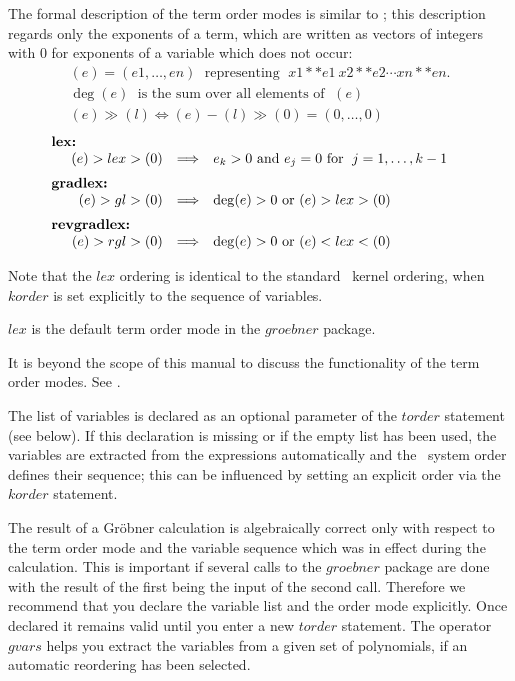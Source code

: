 The formal description of the term order modes is similar to
\cite{Kredel:88}; this description regards only the exponents of a term,
which are written as vectors of integers with $0$ for exponents of a
variable which does not occur:
\[
\begin{array}{l}
  (e) = (e1,\ldots , en) \;\mbox{ representing }\; x1**e1 \ x2**e2 \cdots
  xn**en. \\
  \deg(e) \; \mbox{ is the sum over all elements of } \;(e) \\
  (e) \gg (l) \Longleftrightarrow (e)-(l)\gg (0) = (0,\ldots ,0)
\end{array}
\]
\[
\begin{array}{rll}
\multicolumn{1}{l}{\hspace*{-.5cm}\mbox{\bf lex:}} \\
  (e) > lex > (0) & \Longrightarrow  & e_k > 0 \mbox{ and } e_j =0
\mbox{ for }\; j=1,\ldots , k-1\vspace*{2mm} \\
\multicolumn{1}{l}{\hspace*{-.5cm}\mbox{\bf
gradlex:}} \\
  (e) >gl> (0)  & \Longrightarrow  & \deg(e)>0  \mbox { or } (e) >lex>
(0)\vspace*{2mm} \\
\multicolumn{1}{l}{\hspace*{-.5cm}\mbox{\bf
revgradlex:}}\\
  (e) >rgl> (0) & \Longrightarrow & \deg(e)>0  \mbox{ or }(e)  <lex<
(0)
\end{array}
\]

Note that the $lex$ ordering is identical to the standard \REDUCE \ 
kernel ordering, when $korder$ is set explicitly to the sequence of
variables.

$lex$ is the default term order mode in the $groebner$ package.

It is beyond the scope of this manual to discuss the functionality of
the term order modes. See \cite{Buchberger:88}.

The list of variables is declared as an optional parameter of the
$torder$ statement (see below). If this declaration is missing
or if the empty list has been used, the variables are extracted from
the expressions automatically and the \REDUCE \  system order defines
their sequence; this can be influenced by setting an explicit order
via the $korder$ statement.

The result of a Gr\"obner calculation is algebraically correct only
with respect to the term order mode and the variable sequence
which was in effect during the calculation. This is important if
several calls to the $groebner$ package are done with the result of the
first being the input of the second call. Therefore we recommend
that you declare the variable list and the order mode explicitly.
Once declared it remains valid until you enter a new $torder$
statement. The operator $gvars$ helps you extract the variables
from a given set of polynomials, if an automatic reordering has been selected.

